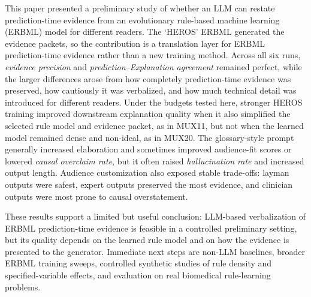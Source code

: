\documentclass[sigconf]{acmart}
\begin{document}
This paper presented a preliminary study of whether an LLM can restate prediction-time evidence from an evolutionary rule-based machine learning (ERBML) model for different readers. The `HEROS' ERBML generated the evidence packets, so the contribution is a translation layer for ERBML prediction-time evidence rather than a new training method. Across all six runs, \emph{evidence precision} and \emph{prediction--Explanation agreement} remained perfect, while the larger differences arose from how completely prediction-time evidence was preserved, how cautiously it was verbalized, and how much technical detail was introduced for different readers. Under the budgets tested here, stronger HEROS training improved downstream explanation quality when it also simplified the selected rule model and evidence packet, as in MUX11, but not when the learned model remained dense and non-ideal, as in MUX20. The glossary-style prompt generally increased elaboration and sometimes improved audience-fit scores or lowered \emph{causal overclaim rate}, but it often raised \emph{hallucination rate} and increased output length. Audience customization also exposed stable trade-offs: layman outputs were safest, expert outputs preserved the most evidence, and clinician outputs were most prone to causal overstatement.



These results support a limited but useful conclusion: LLM-based verbalization of ERBML prediction-time evidence is feasible in a controlled preliminary setting, but its quality depends on the learned rule model and on how the evidence is presented to the generator. Immediate next steps are non-LLM baselines, broader ERBML training sweeps, controlled synthetic studies of rule density and specified-variable effects, and evaluation on real biomedical rule-learning problems.
\end{document}
